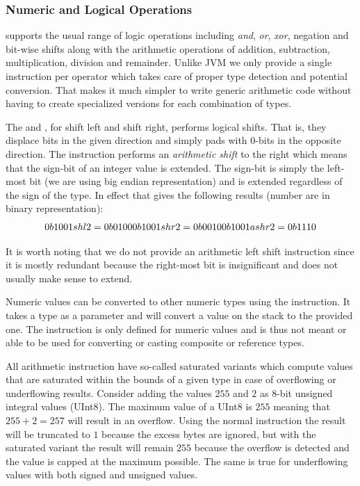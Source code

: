 \subsubsection{Numeric and Logical Operations}

\thename{} supports the usual range of logic operations including \emph{and},
\emph{or}, \emph{xor}, negation and bit-wise shifts along with the arithmetic
operations of addition, subtraction, multiplication, division and
remainder. Unlike JVM we only provide a single instruction per operator which
takes care of proper type detection and potential conversion. That makes it much
simpler to write generic arithmetic code without having to create specialized
versions for each combination of types.

The  and , for shift left and shift right,
performs logical shifts. That is, they displace bits in the given direction and
simply pads with 0-bits in the opposite direction. The 
instruction performs an \textit{arithmetic shift} to the right which means that
the sign-bit of an integer value is extended. The sign-bit is simply the
left-most bit (we are using big endian representation) and is extended
regardless of the sign of the type. In effect that gives the following results
(number are in binary representation):
\[
0b1001 shl 2  = 0b0100 \\
0b1001 shr 2  = 0b0010 \\
0b1001 ashr 2 = 0b1110 \\
\]

It is worth noting that we do not provide an arithmetic left shift instruction
since it is mostly redundant because the right-most bit is insignificant and
does not usually make sense to extend.

Numeric values can be converted to other numeric types using the 
instruction. It takes a type as a parameter and will convert a value on the
stack to the provided one. The  instruction is only defined for
numeric values and is thus not meant or able to be used for converting or
casting composite or reference types.

All arithmetic instruction have so-called saturated variants which compute
values that are saturated within the bounds of a given type in case of
overflowing or underflowing results. Consider adding the values $255$ and $2$ as
8-bit unsigned integral values (UInt8). The maximum value of a UInt8 is $255$
meaning that $255+2=257$ will result in an overflow. Using the normal
 instruction the result will be truncated to $1$ because the excess
bytes are ignored, but with the saturated variant the result will remain $255$
because the overflow is detected and the value is capped at the maximum
possible. The same is true for underflowing values with both signed and unsigned
values.

